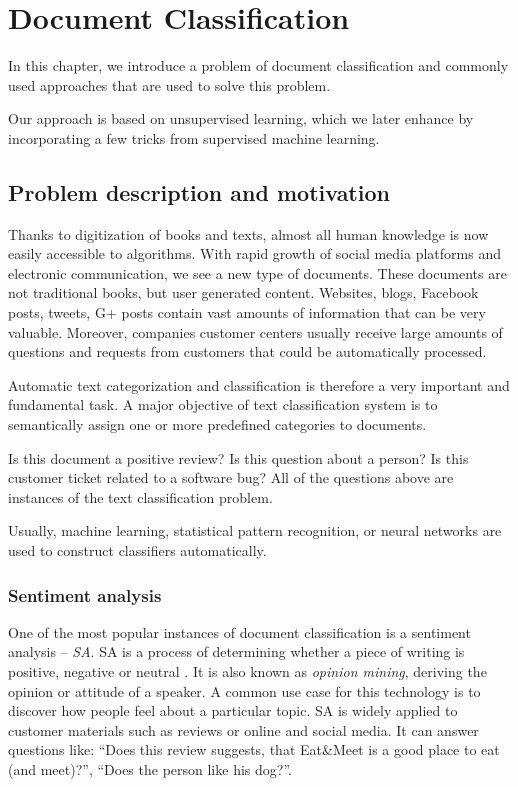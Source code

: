 \chapter{Document Classification}

    In this chapter, we introduce a problem of document classification and commonly used approaches that are used to solve this problem.
    
    Our approach is based on unsupervised learning, which we later enhance by incorporating a few tricks from supervised machine learning.

\section{Problem description and motivation} \label{sec:problem}

    Thanks to digitization of books and texts, almost all human knowledge is now easily accessible to algorithms. 
    With rapid growth of social media platforms and electronic communication, we see a new type of documents.
    These documents are not traditional books, but user generated content.
    Websites, blogs, Facebook posts, tweets, G+ posts contain vast amounts of information that can be very valuable.
    Moreover, companies customer centers usually receive large amounts of questions and requests from customers that could be automatically processed.
    
    Automatic text categorization and classification is therefore a very important and fundamental task. 
    A major objective of text classification system is to semantically assign one or more predefined categories to documents.
    
    Is this document a positive review? 
    Is this question about a person?
    Is this customer ticket related to a software bug?
    All of the questions above are instances of the text classification problem.
    
    Usually, machine learning, statistical pattern recognition, or neural networks are used to construct classifiers automatically.

    \subsection{Sentiment analysis}
    
    One of the most popular instances of document classification is a sentiment analysis -- \emph{SA}.
    SA is a process of determining whether a piece of writing is positive, negative or neutral \cite{jurafsky2000speech}.
    It is also known as \emph{opinion mining}, deriving the opinion or attitude of a speaker. 
    A common use case for this technology is to discover how people feel about a particular topic. SA is widely applied to customer materials such as reviews or online and social media.
    It can answer questions like: ``Does this review suggests, that Eat\&Meet is a good place to eat (and meet)?'', ``Does the person like his dog?''.
    
